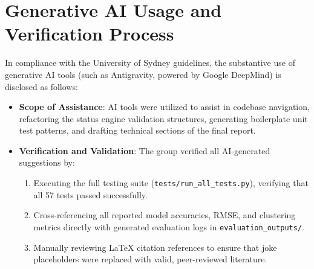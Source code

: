 \documentclass[11pt,a4paper]{article}
\begin{document}
\section{Generative AI Usage and Verification Process}\label{sec:appendix_ai}
In compliance with the University of Sydney guidelines, the substantive use of generative AI tools (such as Antigravity, powered by Google DeepMind) is disclosed as follows:
\begin{itemize}
    \item \textbf{Scope of Assistance}: AI tools were utilized to assist in codebase navigation, refactoring the status engine validation structures, generating boilerplate unit test patterns, and drafting technical sections of the final report.
    \item \textbf{Verification and Validation}: The group verified all AI-generated suggestions by:
    \begin{enumerate}
        \item Executing the full testing suite (\texttt{tests/run_all_tests.py}), verifying that all 57 tests passed successfully.
        \item Cross-referencing all reported model accuracies, RMSE, and clustering metrics directly with generated evaluation logs in \texttt{evaluation_outputs/}.
        \item Manually reviewing LaTeX citation references to ensure that joke placeholders were replaced with valid, peer-reviewed literature.
    \end{enumerate}
\end{itemize}
		
\nocite{*}


	
\end{document}
